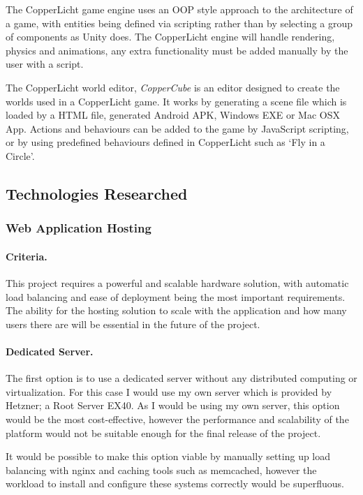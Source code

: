 \documentclass[a4paper, 12pt]{article}
\begin{document}
The CopperLicht game engine uses an OOP style approach to the architecture of a game, with entities being defined via scripting rather than by selecting a group of components as Unity does. The CopperLicht engine will handle rendering, physics and animations, any extra functionality must be added manually by the user with a script.\cite{copperlichtfeatures}

The CopperLicht world editor, \emph{CopperCube} is an editor designed to create the worlds used in a CopperLicht game. It works by generating a scene file which is loaded by a HTML file, generated Android APK, Windows EXE or Mac OSX App.\cite{coppercubefeatures} Actions and behaviours can be added to the game by JavaScript scripting, or by using predefined behaviours defined in CopperLicht such as `Fly in a Circle'.\cite{copperlichtbehaviours}

\subsection{Technologies Researched}
\subsubsection{Web Application Hosting}
\paragraph{Criteria.}
This project requires a powerful and scalable hardware solution, with automatic load balancing and ease of deployment being the most important requirements. The ability for the hosting solution to scale with the application and how many users there are will be essential in the future of the project.

\paragraph{Dedicated Server.}
The first option is to use a dedicated server without any distributed computing or virtualization. For this case I would use my own server which is provided by Hetzner; a Root Server EX40. As I would be using my own server, this option would be the most cost-effective, however the performance and scalability of the platform would not be suitable enough for the final release of the project.

It would be possible to make this option viable by manually setting up load balancing with nginx and caching tools such as memcached, however the workload to install and configure these systems correctly would be superfluous.\cite{nginxloadbalancing,memcached}
\end{document}
